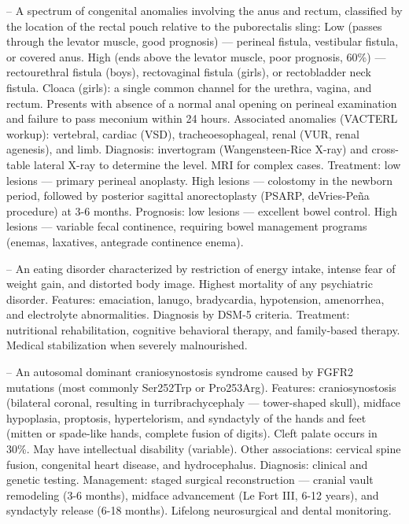 -- A spectrum of congenital anomalies involving the anus and rectum, classified by the location of the rectal pouch relative to the puborectalis sling: Low (passes through the levator muscle, good prognosis) — perineal fistula, vestibular fistula, or covered anus. High (ends above the levator muscle, poor prognosis, 60\%) — rectourethral fistula (boys), rectovaginal fistula (girls), or rectobladder neck fistula. Cloaca (girls): a single common channel for the urethra, vagina, and rectum. Presents with absence of a normal anal opening on perineal examination and failure to pass meconium within 24 hours. Associated anomalies (VACTERL workup): vertebral, cardiac (VSD), tracheoesophageal, renal (VUR, renal agenesis), and limb. Diagnosis: invertogram (Wangensteen-Rice X-ray) and cross-table lateral X-ray to determine the level. MRI for complex cases. Treatment: low lesions — primary perineal anoplasty. High lesions — colostomy in the newborn period, followed by posterior sagittal anorectoplasty (PSARP, deVries-Peña procedure) at 3-6 months. Prognosis: low lesions — excellent bowel control. High lesions — variable fecal continence, requiring bowel management programs (enemas, laxatives, antegrade continence enema).

-- An eating disorder characterized by restriction of energy intake, intense fear of weight gain, and distorted body image. Highest mortality of any psychiatric disorder. Features: emaciation, lanugo, bradycardia, hypotension, amenorrhea, and electrolyte abnormalities. Diagnosis by DSM-5 criteria. Treatment: nutritional rehabilitation, cognitive behavioral therapy, and family-based therapy. Medical stabilization when severely malnourished.

-- An autosomal dominant craniosynostosis syndrome caused by FGFR2 mutations (most commonly Ser252Trp or Pro253Arg). Features: craniosynostosis (bilateral coronal, resulting in turribrachycephaly — tower-shaped skull), midface hypoplasia, proptosis, hypertelorism, and syndactyly of the hands and feet (mitten or spade-like hands, complete fusion of digits). Cleft palate occurs in 30\%. May have intellectual disability (variable). Other associations: cervical spine fusion, congenital heart disease, and hydrocephalus. Diagnosis: clinical and genetic testing. Management: staged surgical reconstruction — cranial vault remodeling (3-6 months), midface advancement (Le Fort III, 6-12 years), and syndactyly release (6-18 months). Lifelong neurosurgical and dental monitoring.

